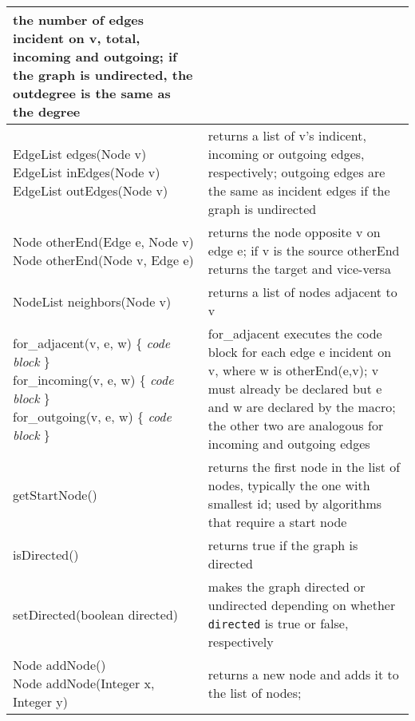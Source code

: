 \begin{table}
\begin{tabular}{| m{} | m{} |}
    the number of edges incident on \textsf{v}, total, incoming and outgoing;
    if the graph is undirected, the outdegree is the same as the degree
    \\ \hline
    \shortstack[l]{
      \textsf{EdgeList edges(Node v)}\\
      \textsf{EdgeList inEdges(Node v)}\\
      \textsf{EdgeList outEdges(Node v)}
    }
    &
    returns a list of \textsf{v}'s
    indicent, incoming or outgoing edges, respectively;
    outgoing edges are the same as incident edges if the graph is undirected 
    \\ \hline
    \shortstack[l]{
      \textsf{Node otherEnd(Edge e, Node v)}\\
      \textsf{Node otherEnd(Node v, Edge e)}
    }
    &
    returns the node opposite \textsf{v} on edge \textsf{e};
    if \textsf{v} is the source \textsf{otherEnd} returns the target and
    vice-versa
    \\ \hline
    \textsf{NodeList neighbors(Node v)}
    &
    returns a list of nodes adjacent to \textsf{v}
    \\ \hline
    \shortstack[l]{
      \textsf{for\_adjacent(v, e, w) \{ \emph{code block} \}} \\
      \textsf{for\_incoming(v, e, w) \{ \emph{code block} \}} \\ 
      \textsf{for\_outgoing(v, e, w) \{ \emph{code block} \}}
    }
    &
    \textsf{for\_adjacent} executes the code block for each edge \textsf{e}
    incident on \textsf{v}, where \textsf{w} is \textsf{otherEnd(e,v)};
    \textsf{v} must already be declared but \textsf{e} and \textsf{w} are
    declared by the macro;
    the other two are analogous for incoming and outgoing edges 
    \\ \hline
    \textsf{getStartNode()}
    &
    returns the first node in the list of nodes, typically the one with smallest id;
    used by algorithms that require a start node
    \\ \hline
    \textsf{isDirected()}
    &
    returns true if the graph is directed
    \\ \hline
    \textsf{setDirected(boolean directed)}
    &
    makes the graph directed or undirected depending on whether \texttt{directed}
    is true or false, respectively
    \\ \hline
    \shortstack[l]{
      \textsf{Node addNode()}\\
      \textsf{Node addNode(Integer x, Integer y)}
    }
    &
    returns a new node and adds it to the list of nodes;

\end{tabular}
\end{table}
